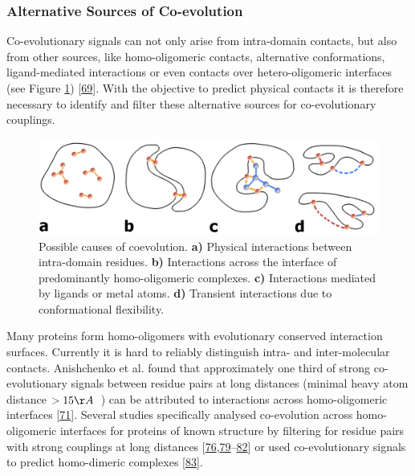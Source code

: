 \documentclass[12pt,a4paper,twoside]{book}
\theoremstyle{definition}
\theoremstyle{definition}
\theoremstyle{remark}
\begin{document}
\subsubsection*{Alternative Sources of
Co-evolution}\label{alternative-sources-of-co-evolution}

Co-evolutionary signals can not only arise from intra-domain contacts,
but also from other sources, like homo-oligomeric contacts, alternative
conformations, ligand-mediated interactions or even contacts over
hetero-oligomeric interfaces (see Figure \ref{fig:sources-coevolution})
{[}\protect\hyperlink{ref-Marks2012}{69}{]}. With the objective to
predict physical contacts it is therefore necessary to identify and
filter these alternative sources for co-evolutionary couplings.








\begin{figure}

{\centering \includegraphics[width=0.8\linewidth]{img/intro/sources_of_coevolution} 

}

\caption{Possible causes of coevolution.
\textbf{a)} Physical interactions between intra-domain residues.
\textbf{b)} Interactions across the interface of predominantly
homo-oligomeric complexes. \textbf{c)} Interactions mediated by ligands
or metal atoms. \textbf{d)} Transient interactions due to conformational
flexibility.}\label{fig:sources-coevolution}
\end{figure}

Many proteins form homo-oligomers with evolutionary conserved
interaction surfaces. Currently it is hard to reliably distinguish
intra- and inter-molecular contacts. Anishchenko et al. found that
approximately one third of strong co-evolutionary signals between
residue pairs at long distances (minimal heavy atom distance
\(>15 \AA \;\;\)) can be attributed to interactions across
homo-oligomeric interfaces
{[}\protect\hyperlink{ref-Anishchenko2017}{71}{]}. Several studies
specifically analysed co-evolution across homo-oligomeric interfaces for
proteins of known structure by filtering for residue pairs with strong
couplings at long distances
{[}\protect\hyperlink{ref-Hopf2012}{76},\protect\hyperlink{ref-Lee2009}{79}--\protect\hyperlink{ref-Jana2014}{82}{]}
or used co-evolutionary signals to predict homo-dimeric complexes
{[}\protect\hyperlink{ref-DosSantos2015a}{83}{]}.
\end{document}
